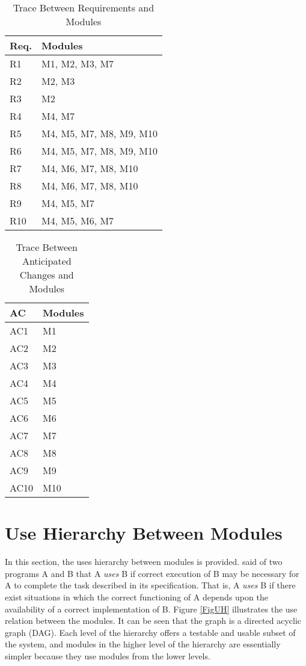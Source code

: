 \documentclass[12pt]{article}
\begin{document}
\begin{table}[H]
\centering
\begin{tabular}{p{} p{}}
\toprule
\textbf{Req.} & \textbf{Modules}\\
\midrule
R1 & M1, M2, M3, M7\\
R2 & M2, M3\\
R3 & M2\\
R4 & M4, M7\\
R5 & M4, M5, M7, M8, M9, M10\\
R6 & M4, M5, M7, M8, M9, M10\\
R7 & M4, M6, M7, M8, M10\\
R8 & M4, M6, M7, M8, M10\\
R9 & M4, M5, M7\\
R10 & M4, M5, M6, M7\\
\bottomrule
\end{tabular}
\caption{Trace Between Requirements and Modules}
\label{TblRT}
\end{table}

\begin{table}[H]
\centering
\begin{tabular}{p{} p{}}
\toprule
\textbf{AC} & \textbf{Modules}\\
\midrule
AC1 & M1\\
AC2 & M2\\
AC3 & M3\\
AC4 & M4\\
AC5 & M5\\
AC6 & M6\\
AC7 & M7\\
AC8 & M8\\
AC9 & M9\\
AC10 & M10\\
\bottomrule
\end{tabular}
\caption{Trace Between Anticipated Changes and Modules}
\label{TblRT}
\end{table}
\section{Use Hierarchy Between Modules} \label{SecUse}

In this section, the uses hierarchy between modules is
provided. \citet{Parnas1978} said of two programs A and B that A {\em uses} B if
correct execution of B may be necessary for A to complete the task described in
its specification. That is, A {\em uses} B if there exist situations in which
the correct functioning of A depends upon the availability of a correct
implementation of B.  Figure \ref{FigUH} illustrates the use relation between
the modules. It can be seen that the graph is a directed acyclic graph
(DAG). Each level of the hierarchy offers a testable and usable subset of the
system, and modules in the higher level of the hierarchy are essentially simpler
because they use modules from the lower levels.
\end{document}
